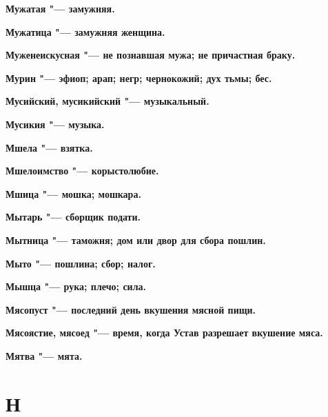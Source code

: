 \begin{mymulticols}{2}
\bfseries Мужатая\normalfont{} "--- замужняя. 




\bfseries Мужатица\normalfont{} "--- замужняя женщина. 




\bfseries Муженеискусная\normalfont{} "--- не познавшая мужа; не причастная браку. 




\bfseries Мурин\normalfont{} "--- эфиоп; арап; негр; чернокожий; дух тьмы; бес. 




\bfseries Мусийский, мусикийский\normalfont{} "--- музыкальный. 




\bfseries Мусикия\normalfont{} "--- музыка. 




\bfseries Мшела\normalfont{} "--- взятка. 




\bfseries Мшелоимство\normalfont{} "--- корыстолюбие. 




\bfseries Мшица\normalfont{} "--- мошка; мошкара. 




\bfseries Мытарь\normalfont{} "--- сборщик подати. 




\bfseries Мытница\normalfont{} "--- таможня; дом или двор для сбора пошлин. 




\bfseries Мыто\normalfont{} "--- пошлина; сбор; налог. 




\bfseries Мышца\normalfont{} "--- рука; плечо; сила. 




\bfseries Мясопуст\normalfont{} "--- последний день вкушения мясной пищи. 




\bfseries Мясоястие, мясоед\normalfont{} "--- время, когда Устав разрешает вкушение мяса. 




\bfseries Мятва\normalfont{} "--- мята. 




\section{Н}






\end{mymulticols}
